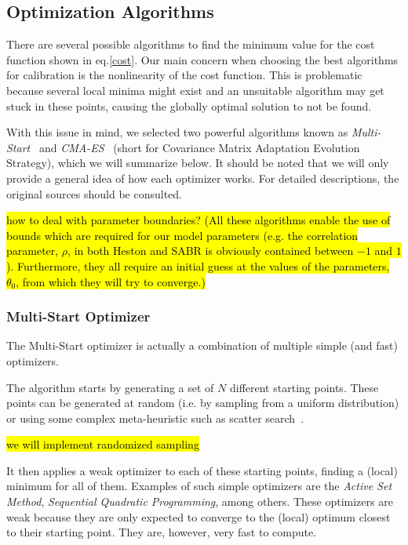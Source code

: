\subsection{Optimization Algorithms}
There are several possible algorithms to find the minimum value for the cost function shown in eq.\eqref{cost}.
Our main concern when choosing the best algorithms for calibration is the nonlinearity of the cost function. This is problematic because several local minima might exist and an unsuitable algorithm may get stuck in these points, causing the globally optimal solution to not be found.

With this issue in mind, we selected two powerful algorithms known as \emph{Multi-Start}~\cite{Ugray} and \emph{CMA-ES}~\cite{Hansen2} (short for Covariance Matrix Adaptation Evolution Strategy), which we will summarize below. It should be noted that we will only provide a general idea of how each optimizer works. For detailed descriptions, the original sources should be consulted.

\hl{how to deal with parameter boundaries? (All these algorithms enable the use of bounds which are required for our model parameters (e.g. the correlation parameter, $\rho$, in both Heston and SABR is obviously contained between $-1$ and $1$). Furthermore, they all require an initial guess at the values of the parameters, $\theta_0$, from which they will try to converge.)}

\subsubsection{Multi-Start Optimizer}
The Multi-Start optimizer is actually a combination of multiple simple (and fast) optimizers.


The algorithm starts by generating a set of $N$ different starting points. These points can be generated at random (i.e. by sampling from a uniform distribution) or using some complex meta-heuristic such as scatter search~\cite{Ugray}.

\hl{we will implement randomized sampling}

It then applies a weak optimizer to each of these starting points, finding a (local) minimum for all of them. Examples of such simple optimizers are the \emph{Active Set Method}, \emph{Sequential Quadratic Programming}, among others. These optimizers are weak because they are only expected to converge to the (local) optimum closest to their starting point. They are, however, very fast to compute.

